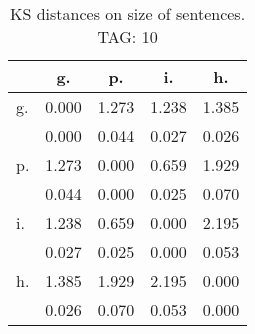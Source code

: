 \begin{table}[h!]
\begin{center}
\begin{tabular}{| l | c | c | c | c |}\hline
 & g. & p. & i. & h. \\\hline
g. & 0.000  & 1.273  & 1.238  & 1.385 \\\hline
 & 0.000  & 0.044  & 0.027  & 0.026 \\\hline
p. & 1.273  & 0.000  & 0.659  & 1.929 \\\hline
 & 0.044  & 0.000  & 0.025  & 0.070 \\\hline
i. & 1.238  & 0.659  & 0.000  & 2.195 \\\hline
 & 0.027  & 0.025  & 0.000  & 0.053 \\\hline
h. & 1.385  & 1.929  & 2.195  & 0.000 \\\hline
 & 0.026  & 0.070  & 0.053  & 0.000 \\\hline
\end{tabular}
\caption{KS distances on size of sentences. TAG: 10}
\end{center}
\end{table}